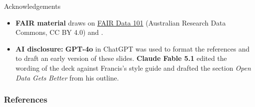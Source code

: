 \documentclass[aspectratio=169]{beamer}
\begin{document}


\begin{frame}[allowframebreaks]{Acknowledgements}
  \small
  \begin{itemize}
  \item \textbf{FAIR material} draws on
    \href{https://au-research.github.io/FAIR-data-101-training/}{FAIR Data 101}
    (Australian Research Data Commons, CC BY 4.0) and \citet{FAIR2016}.
  \item \textbf{AI disclosure:} \textbf{GPT-4o} in ChatGPT
    \citep{openai-chatgpt-2025-03-14} was used to format the references and
    to draft an early version of these slides.  \textbf{Claude Fable 5.1}
    \citep{anthropic-claude-fable-5-1-2026-10-27} edited the wording of the
    deck against Francis's style guide and drafted the section \emph{Open Data
    Gets Better} from his outline.
  \aicheck
  \end{itemize}
\end{frame}


\begin{frame}[allowframebreaks]
\frametitle{References}
\printbibliography[heading=none]
\end{frame}
\end{document}
